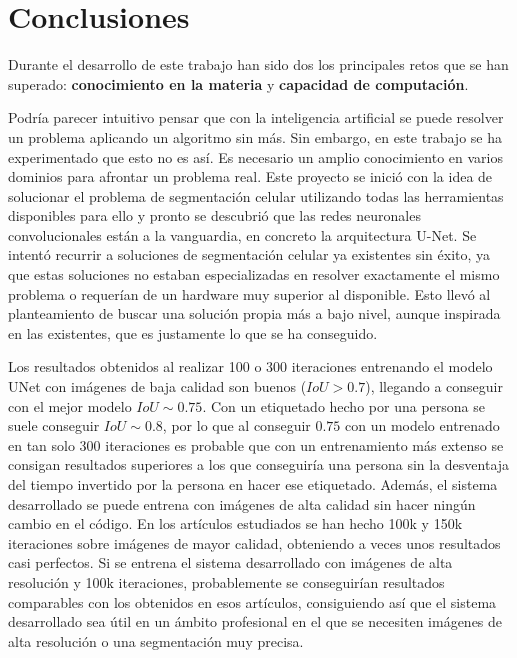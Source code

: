 \chapter{Conclusiones}\label{pruebas}

Durante el desarrollo de este trabajo han sido dos los principales retos que se han superado: \textbf{conocimiento en la materia} y \textbf{capacidad de computación}.

Podría parecer intuitivo pensar que con la inteligencia artificial se puede resolver un problema aplicando un algoritmo sin más. Sin embargo, en este trabajo se ha experimentado que esto no es así. Es necesario un amplio conocimiento en varios dominios para afrontar un problema real. Este proyecto se inició con la idea de solucionar el problema de segmentación celular utilizando todas las herramientas disponibles para ello y pronto se descubrió que las redes neuronales convolucionales están a la vanguardia, en concreto la arquitectura U-Net. Se intentó recurrir a soluciones de segmentación celular ya existentes sin éxito, ya que estas soluciones no estaban especializadas en resolver exactamente el mismo problema o requerían de un hardware muy superior al disponible. Esto llevó al planteamiento de buscar una solución propia más a bajo nivel, aunque inspirada en las existentes, que es justamente lo que se ha conseguido.

Los resultados obtenidos al realizar 100 o 300 iteraciones entrenando el modelo UNet con imágenes de baja calidad son buenos ($IoU>0.7$), llegando a conseguir con el mejor modelo $IoU\sim0.75$. Con un etiquetado hecho por una persona se suele conseguir $IoU\sim0.8$, por lo que al conseguir $0.75$ con un modelo entrenado en tan solo 300 iteraciones es probable que con un entrenamiento más extenso se consigan resultados superiores a los que conseguiría una persona sin la desventaja del tiempo invertido por la persona en hacer ese etiquetado. Además, el sistema desarrollado se puede entrena con imágenes de alta calidad sin hacer ningún cambio en el código. En los artículos estudiados se han hecho 100k y 150k iteraciones sobre imágenes de mayor calidad, obteniendo a veces unos resultados casi perfectos. Si se entrena el sistema desarrollado con imágenes de alta resolución y 100k iteraciones, probablemente se conseguirían resultados comparables con los obtenidos en esos artículos, consiguiendo así que el sistema desarrollado sea útil en un ámbito profesional en el que se necesiten imágenes de alta resolución o una segmentación muy precisa.

